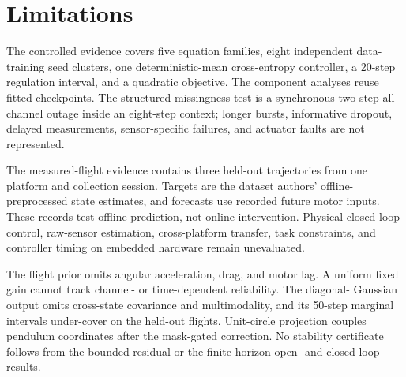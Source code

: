 \section{Limitations}

The controlled evidence covers five equation families, eight independent
data-training seed clusters, one deterministic-mean cross-entropy controller,
a 20-step regulation interval, and a quadratic objective. The component
analyses reuse fitted checkpoints. The structured missingness test is a
synchronous two-step all-channel outage inside an eight-step context; longer
bursts, informative dropout, delayed measurements, sensor-specific failures,
and actuator faults are not represented.

The measured-flight evidence contains three held-out trajectories from one
platform and collection session. Targets are the dataset authors' offline-
preprocessed state estimates, and forecasts use recorded future motor inputs.
These records test offline prediction, not online intervention. Physical
closed-loop control, raw-sensor estimation, cross-platform transfer, task
constraints, and controller timing on embedded hardware remain unevaluated.

The flight prior omits angular acceleration, drag, and motor lag. A uniform
fixed gain cannot track channel- or time-dependent reliability. The diagonal-
Gaussian output omits cross-state covariance and multimodality, and its
50-step marginal intervals under-cover on the held-out flights. Unit-circle
projection couples pendulum coordinates after the mask-gated correction. No
stability certificate follows from the bounded residual or the finite-horizon
open- and closed-loop results.
